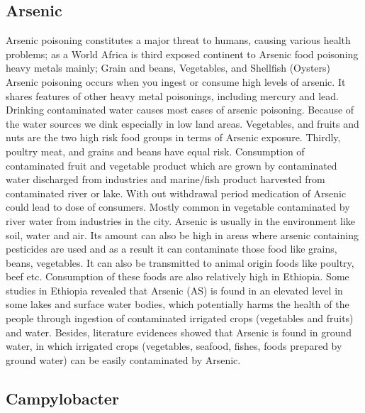 \documentclass[
  letterpaper,
  DIV=11,
  numbers=noendperiod]{scrartcl}
\begin{document}
\subsection*{Arsenic}\label{arsenic}

Arsenic poisoning constitutes a major threat to humans, causing various
health problems; as a World Africa is third exposed continent to Arsenic
food poisoning heavy metals mainly; Grain and beans, Vegetables, and
Shellfish (Oysters) Arsenic poisoning occurs when you ingest or consume
high levels of arsenic. It shares features of other heavy metal
poisonings, including mercury and lead. Drinking contaminated water
causes most cases of arsenic poisoning. Because of the water sources we
dink especially in low land areas. Vegetables, and fruits and nuts are
the two high risk food groups in terms of Arsenic exposure. Thirdly,
poultry meat, and grains and beans have equal risk. Consumption of
contaminated fruit and vegetable product which are grown by contaminated
water discharged from industries and marine/fish product harvested from
contaminated river or lake. With out withdrawal period medication of
Arsenic could lead to dose of consumers. Mostly common in vegetable
contaminated by river water from industries in the city. Arsenic is
usually in the environment like soil, water and air. Its amount can also
be high in areas where arsenic containing pesticides are used and as a
result it can contaminate those food like grains, beans, vegetables. It
can also be transmitted to animal origin foods like poultry, beef etc.
Consumption of these foods are also relatively high in Ethiopia. Some
studies in Ethiopia revealed that Arsenic (AS) is found in an elevated
level in some lakes and surface water bodies, which potentially harms
the health of the people through ingestion of contaminated irrigated
crops (vegetables and fruits) and water. Besides, literature evidences
showed that Arsenic is found in ground water, in which irrigated crops
(vegetables, seafood, fishes, foods prepared by ground water) can be
easily contaminated by Arsenic.

\subsection*{Campylobacter}\label{campylobacter}
\end{document}
